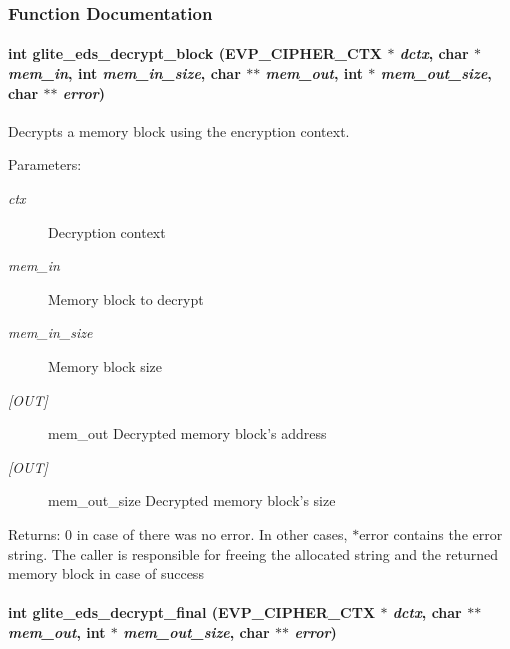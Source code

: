 \subsubsection{Function Documentation}
\hypertarget{eds-simple_8h_a6}{
\paragraph[glite\_\-eds\_\-decrypt\_\-block]{\setlength{\rightskip}{0pt plus 5cm}int glite\_\-eds\_\-decrypt\_\-block (EVP\_\-CIPHER\_\-CTX $\ast$ {\em dctx}, char $\ast$ {\em mem\_\-in}, int {\em mem\_\-in\_\-size}, char $\ast$$\ast$ {\em mem\_\-out}, int $\ast$ {\em mem\_\-out\_\-size}, char $\ast$$\ast$ {\em error})}\hfill}
\label{eds-simple_8h_a6}


Decrypts a memory block using the encryption context. 

\begin{Desc}
\item[Parameters:]
\begin{description}
\item[{\em ctx}]Decryption context \item[{\em mem\_\-in}]Memory block to decrypt \item[{\em mem\_\-in\_\-size}]Memory block size \item[{\em \mbox{[}OUT\mbox{]}}]mem\_\-out Decrypted memory block's address \item[{\em \mbox{[}OUT\mbox{]}}]mem\_\-out\_\-size Decrypted memory block's size\end{description}
\end{Desc}
\begin{Desc}
\item[Returns:]0 in case of there was no error. In other cases, $\ast$error contains the error string. The caller is responsible for freeing the allocated string and the returned memory block in case of success \end{Desc}
\hypertarget{eds-simple_8h_a7}{
\paragraph[glite\_\-eds\_\-decrypt\_\-final]{\setlength{\rightskip}{0pt plus 5cm}int glite\_\-eds\_\-decrypt\_\-final (EVP\_\-CIPHER\_\-CTX $\ast$ {\em dctx}, char $\ast$$\ast$ {\em mem\_\-out}, int $\ast$ {\em mem\_\-out\_\-size}, char $\ast$$\ast$ {\em error})}\hfill}
\label{eds-simple_8h_a7}


